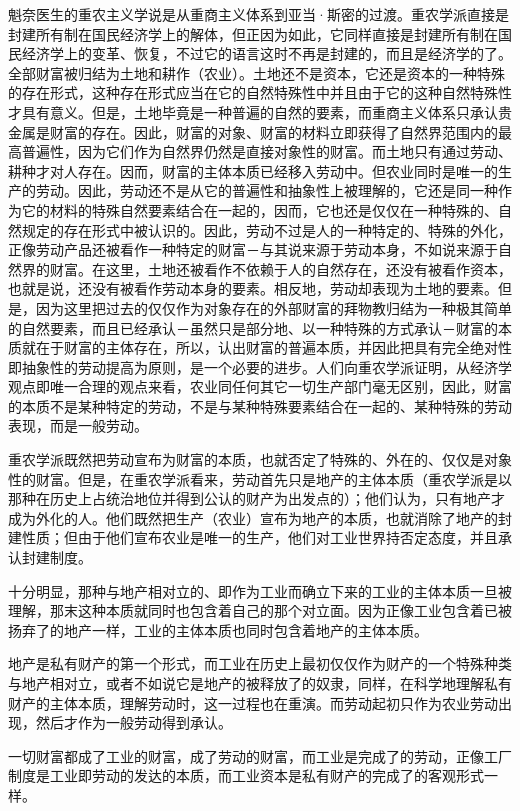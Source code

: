 \documentclass[a4paper,twoside,12pt]{ctexart}
\begin{document}
魁奈医生的重农主义学说是从重商主义体系到亚当·斯密的过渡。重农学派直接是封建所有制在国民经济学上的解体，但正因为如此，它同样直接是封建所有制在国民经济学上的变革、恢复，不过它的语言这时不再是封建的，而且是经济学的了。全部财富被归结为土地和耕作（农业）。土地还不是资本，它还是资本的一种特殊的存在形式，这种存在形式应当在它的自然特殊性中并且由于它的这种自然特殊性才具有意义。但是，土地毕竟是一种普遍的自然的要素，而重商主义体系只承认贵金属是财富的存在。因此，财富的对象、财富的材料立即获得了自然界范围内的最高普遍性，因为它们作为自然界仍然是直接对象性的财富。而土地只有通过劳动、耕种才对人存在。因而，财富的主体本质已经移入劳动中。但农业同时是唯一的生产的劳动。因此，劳动还不是从它的普遍性和抽象性上被理解的，它还是同一种作为它的材料的特殊自然要素结合在一起的，因而，它也还是仅仅在一种特殊的、自然规定的存在形式中被认识的。因此，劳动不过是人的一种特定的、特殊的外化，正像劳动产品还被看作一种特定的财富－与其说来源于劳动本身，不如说来源于自然界的财富。在这里，土地还被看作不依赖于人的自然存在，还没有被看作资本，也就是说，还没有被看作劳动本身的要素。相反地，劳动却表现为土地的要素。但是，因为这里把过去的仅仅作为对象存在的外部财富的拜物教归结为一种极其简单的自然要素，而且已经承认－虽然只是部分地、以一种特殊的方式承认－财富的本质就在于财富的主体存在，所以，认出财富的普遍本质，并因此把具有完全绝对性即抽象性的劳动提高为原则，是一个必要的进步。人们向重农学派证明，从经济学观点即唯一合理的观点来看，农业同任何其它一切生产部门毫无区别，因此，财富的本质不是某种特定的劳动，不是与某种特殊要素结合在一起的、某种特殊的劳动表现，而是一般劳动。

重农学派既然把劳动宣布为财富的本质，也就否定了特殊的、外在的、仅仅是对象性的财富。但是，在重农学派看来，劳动首先只是地产的主体本质（重农学派是以那种在历史上占统治地位并得到公认的财产为出发点的）；他们认为，只有地产才成为外化的人。他们既然把生产（农业）宣布为地产的本质，也就消除了地产的封建性质；但由于他们宣布农业是唯一的生产，他们对工业世界持否定态度，并且承认封建制度。

十分明显，那种与地产相对立的、即作为工业而确立下来的工业的主体本质一旦被理解，那末这种本质就同时也包含着自己的那个对立面。因为正像工业包含着已被扬弃了的地产一样，工业的主体本质也同时包含着地产的主体本质。

地产是私有财产的第一个形式，而工业在历史上最初仅仅作为财产的一个特殊种类与地产相对立，或者不如说它是地产的被释放了的奴隶，同样，在科学地理解私有财产的主体本质，理解劳动时，这一过程也在重演。而劳动起初只作为农业劳动出现，然后才作为一般劳动得到承认。

一切财富都成了工业的财富，成了劳动的财富，而工业是完成了的劳动，正像工厂制度是工业即劳动的发达的本质，而工业资本是私有财产的完成了的客观形式一样。
\end{document}
